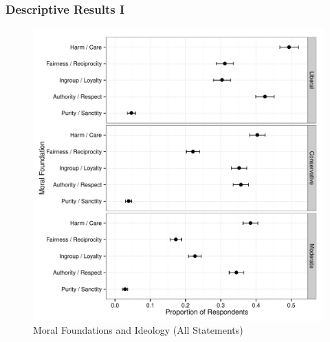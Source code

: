 \documentclass{beamer}
\begin{document}
\subsection{}
\begin{frame}%
  \frametitle{Descriptive Results I}
  \begin{figure}[ht]\centering
    \includegraphics[height=.75\textheight]{p1_mft_ideol}
    \caption{Moral Foundations and Ideology (All Statements)}
  \end{figure}
\end{frame}
\end{document}
